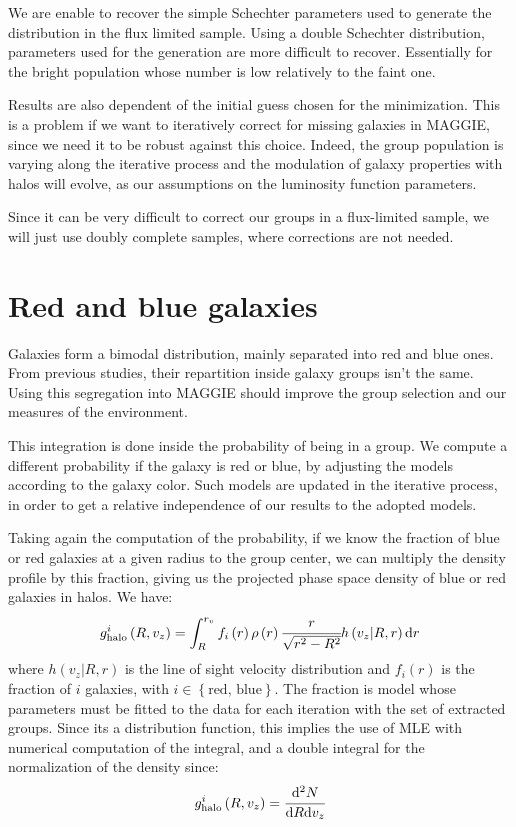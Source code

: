 %
We are enable to recover the simple Schechter parameters used to generate
the distribution in the flux limited sample. Using a double Schechter
distribution, parameters used for the generation are more difficult to
recover. Essentially for the bright population whose number is low
relatively to the faint one.

Results are also dependent of the initial guess chosen for the minimization.
This is a problem if we want to iteratively correct for missing galaxies in
MAGGIE, since we need it to be robust against this choice. Indeed, the group
population is varying along the iterative process and the modulation of
galaxy properties with halos will evolve, as our assumptions on the
luminosity function parameters.

Since it can be very difficult to correct our groups in a flux-limited
sample, we will just use doubly complete samples, where corrections are not
needed.
%
\section{Red and blue galaxies}
%
Galaxies form a bimodal distribution, mainly separated into red and blue
ones. From previous studies, their repartition inside galaxy groups isn't
the same. Using this segregation into MAGGIE should improve the group
selection and our measures of the environment.

This integration is done inside the probability of being in a group. We
compute a different probability if the galaxy is red or blue, by adjusting
the models according to the galaxy color. Such models are updated in the
iterative process, in order to get a relative independence of our results to
the adopted models.

Taking again the computation of the probability, if we know the fraction of
blue or red galaxies at a given radius to the group center, we can multiply
the density profile by this fraction, giving us the projected phase space
density of blue or red galaxies in halos. We have:
%
\begin{equation}
    g_\mathrm{halo}^i\left(R, v_z\right)=\int_R^{r_v} f_i\left(r\right) \rho\left(r\right)
    \cfrac{r}{\sqrt{r^2-R^2}} h\left(v_z|R,r\right) {\rm{d}}{r}
\end{equation}
%
where $h\left(v_z|R,r\right)$ is the line of sight velocity distribution and
$f_i\left(r\right)$ is the fraction of $i$ galaxies, with
$i\in\left\{\mbox{red, blue}\right\}$. The fraction is model whose
parameters must be fitted to the data for each iteration with the set of
extracted groups. Since its a distribution function, this implies the use of
MLE with numerical computation of the integral, and a double integral for
the normalization of the density since:
%
\begin{equation}
    g_\mathrm{halo}^i\left(R, v_z\right) = \cfrac{{\rm{d}}^2N}{{\rm{d}} R{\rm{d}} v_z}
\end{equation}

